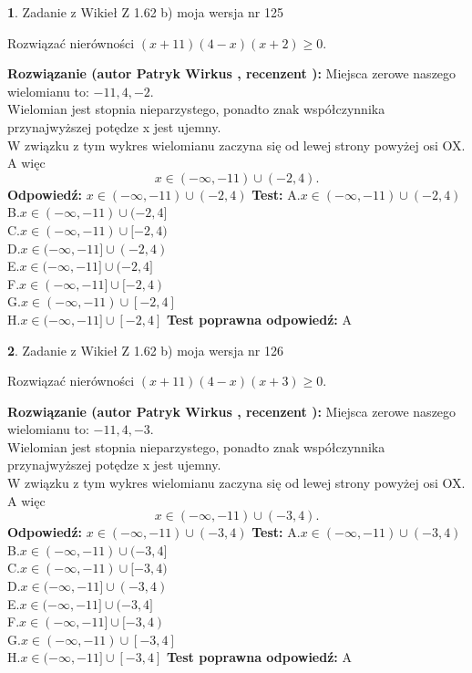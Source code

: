 \documentclass[12pt, a4paper]{article}
\theoremstyle{definition} %
\newtheorem{zad}{}
\newcommand{\zadStart}[1]{\begin{zad}#1\newline}
\newcommand{\zadStop}{\end{zad}}
\newcommand{\rozwStart}[2]{\noindent \textbf{Rozwiązanie (autor #1 , recenzent #2): }\newline}
\newcommand{\rozwStop}{\newline}
\newcommand{\odpStart}{\noindent \textbf{Odpowiedź:}\newline}
\newcommand{\odpStop}{\newline}
\newcommand{\testStart}{\noindent \textbf{Test:}\newline}
\newcommand{\testStop}{\newline}
\newcommand{\kluczStart}{\noindent \textbf{Test poprawna odpowiedź:}\newline}
\newcommand{\kluczStop}{\newline}
\begin{document}
\zadStart{Zadanie z Wikieł Z 1.62 b) moja wersja nr 125}

Rozwiązać nierówności $(x+11)(4-x)(x+2)\ge0$.
\zadStop
\rozwStart{Patryk Wirkus}{}
Miejsca zerowe naszego wielomianu to: $-11, 4, -2$.\\
Wielomian jest stopnia nieparzystego, ponadto znak współczynnika przy\linebreak najwyższej potędze x jest ujemny.\\ W związku z tym wykres wielomianu zaczyna się od lewej strony powyżej osi OX. A więc $$x \in (-\infty,-11) \cup (-2,4).$$
\rozwStop
\odpStart
$x \in (-\infty,-11) \cup (-2,4)$
\odpStop
\testStart
A.$x \in (-\infty,-11) \cup (-2,4)$\\
B.$x \in (-\infty,-11) \cup (-2,4]$\\
C.$x \in (-\infty,-11) \cup [-2,4)$\\
D.$x \in (-\infty,-11] \cup (-2,4)$\\
E.$x \in (-\infty,-11] \cup (-2,4]$\\
F.$x \in (-\infty,-11] \cup [-2,4)$\\
G.$x \in (-\infty,-11) \cup [-2,4]$\\
H.$x \in (-\infty,-11] \cup [-2,4]$
\testStop
\kluczStart
A
\kluczStop



\zadStart{Zadanie z Wikieł Z 1.62 b) moja wersja nr 126}

Rozwiązać nierówności $(x+11)(4-x)(x+3)\ge0$.
\zadStop
\rozwStart{Patryk Wirkus}{}
Miejsca zerowe naszego wielomianu to: $-11, 4, -3$.\\
Wielomian jest stopnia nieparzystego, ponadto znak współczynnika przy\linebreak najwyższej potędze x jest ujemny.\\ W związku z tym wykres wielomianu zaczyna się od lewej strony powyżej osi OX. A więc $$x \in (-\infty,-11) \cup (-3,4).$$
\rozwStop
\odpStart
$x \in (-\infty,-11) \cup (-3,4)$
\odpStop
\testStart
A.$x \in (-\infty,-11) \cup (-3,4)$\\
B.$x \in (-\infty,-11) \cup (-3,4]$\\
C.$x \in (-\infty,-11) \cup [-3,4)$\\
D.$x \in (-\infty,-11] \cup (-3,4)$\\
E.$x \in (-\infty,-11] \cup (-3,4]$\\
F.$x \in (-\infty,-11] \cup [-3,4)$\\
G.$x \in (-\infty,-11) \cup [-3,4]$\\
H.$x \in (-\infty,-11] \cup [-3,4]$
\testStop
\kluczStart
A
\kluczStop
\end{document}
